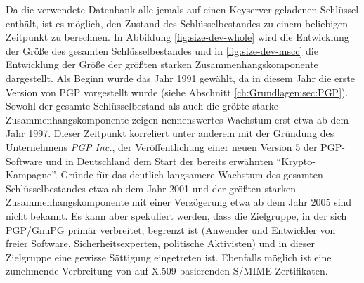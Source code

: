 Da die verwendete Datenbank alle jemals auf einen Keyserver geladenen
Schlüssel enthält, ist es möglich, den Zustand des Schlüsselbestandes
zu einem beliebigen Zeitpunkt zu berechnen. In Abbildung
\ref{fig:size-dev-whole} wird die Entwicklung der Größe des gesamten
Schlüsselbestandes und in \ref{fig:size-dev-mscc} die Entwicklung der
Größe der größten starken Zusammenhangskomponente dargestellt. Als
Beginn wurde das Jahr 1991 gewählt, da in diesem Jahr die erste
Version von PGP vorgestellt wurde (siehe Abschnitt
\ref{ch:Grundlagen:sec:PGP}). Sowohl der gesamte Schlüsselbestand als
auch die größte starke Zusammenhangskomponente zeigen nennenswertes
Wachstum erst etwa ab dem Jahr 1997. Dieser Zeitpunkt korreliert unter
anderem mit der Gründung des Unternehmens \emph{PGP Inc.}, der
Veröffentlichung einer neuen Version 5 der PGP-Software und in
Deutschland dem Start der bereits erwähnten
"`Krypto-Kampagne"'. Gründe für das deutlich langsamere Wachstum des
gesamten Schlüsselbestandes etwa ab dem Jahr 2001 und der größten
starken Zusammenhangskomponente mit einer Verzögerung etwa ab dem Jahr
2005 sind nicht bekannt. Es kann aber spekuliert werden, dass die
Zielgruppe, in der sich PGP/GnuPG prim\"ar verbreitet, begrenzt ist
(Anwender und Entwickler von freier Software, Sicherheitsexperten,
politische Aktivisten) und in dieser Zielgruppe eine gewisse
S\"attigung eingetreten ist. Ebenfalls m\"oglich ist eine zunehmende
Verbreitung von auf X.509 basierenden S/MIME-Zertifikaten.

